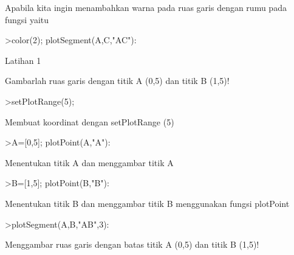 \documentclass[a4paper,10pt]{article}
\begin{document}
\begin{eulernotebook}
\begin{eulercomment}
\begin{eulercomment}
\begin{eulercomment}
Apabila kita ingin menambahkan warna pada ruas garis dengan rumu pada
fungsi yaitu
\end{eulercomment}
\begin{eulerprompt}
>color(2); plotSegment(A,C,"AC"):
\end{eulerprompt}
\begin{eulercomment}
Latihan 1\\
\end{eulercomment}
\eulersubheading{}
\begin{eulercomment}
Gambarlah ruas garis dengan titik A (0,5) dan titik B (1,5)!
\end{eulercomment}
\begin{eulerprompt}
>setPlotRange(5);
\end{eulerprompt}
\begin{eulercomment}
Membuat koordinat dengan setPlotRange (5)
\end{eulercomment}
\begin{eulerprompt}
>A=[0,5]; plotPoint(A,"A"):
\end{eulerprompt}
\begin{eulercomment}
Menentukan titik A dan menggambar titik A
\end{eulercomment}
\begin{eulerprompt}
>B=[1,5]; plotPoint(B,"B"):
\end{eulerprompt}
\begin{eulercomment}
Menentukan titik B dan menggambar titik B menggunakan fungsi plotPoint
\end{eulercomment}
\begin{eulerprompt}
>plotSegment(A,B,"AB",3):
\end{eulerprompt}
\begin{eulercomment}
Menggambar ruas garis dengan batas titik A (0,5) dan titik B (1,5)!


\end{eulercomment}
\end{eulercomment}
\end{eulercomment}
\end{eulernotebook}
\end{document}
